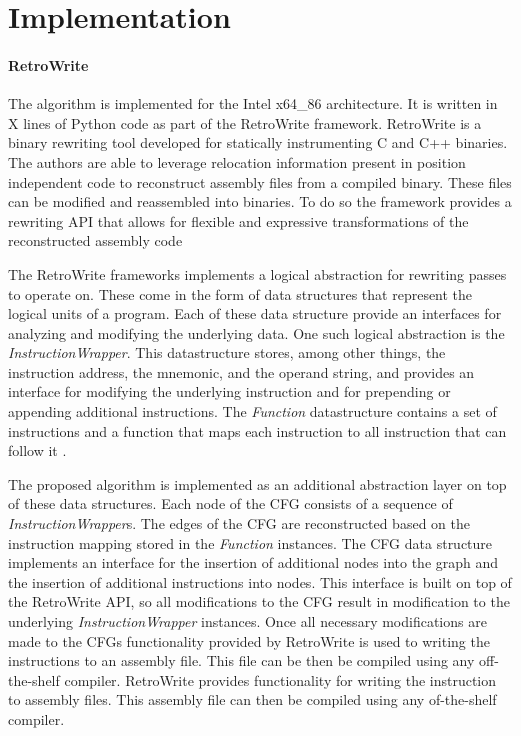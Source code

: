 

\chapter{Implementation}

\subsubsection{RetroWrite}
The algorithm is implemented for the Intel x64\_86 architecture. It is written in X lines of Python code as part of the RetroWrite framework. 
RetroWrite is a binary rewriting tool developed for statically instrumenting C and C++ binaries. 
The authors are able to leverage relocation information present in position independent code to reconstruct assembly files from a compiled binary. 
These files can be modified and reassembled into binaries. 
To do so the framework provides a rewriting API that allows for flexible and expressive transformations of the reconstructed assembly code \cite{Dinesh2020RetroWriteSI}

The RetroWrite frameworks implements a logical abstraction for rewriting passes to operate on.
These come in the form of data structures that represent the logical units of a program.
Each of these data structure provide an interfaces for analyzing and modifying the underlying data. 
One such logical abstraction is the \textit{InstructionWrapper}. 
This datastructure stores, among other things, the instruction address, the mnemonic, and the operand string, and provides an interface
for modifying the underlying instruction and for prepending or appending additional instructions.  
The \textit{Function} datastructure contains a set of instructions and a function that maps each instruction to all instruction that can follow it \cite{Dinesh2020RetroWriteSI,  hexhive}. 

The proposed algorithm is implemented as an additional abstraction layer on top of these data structures. 
Each node of the CFG consists of a sequence of \textit{InstructionWrapper}s. 
The edges of the CFG are reconstructed based on the instruction mapping stored in the \textit{Function} instances. 
The CFG data structure implements  an interface for the insertion of additional nodes into the graph and the insertion of additional instructions into nodes. 
This interface is built on top of the RetroWrite API, so all modifications to the CFG result in modification to the underlying \textit{InstructionWrapper} instances. 
Once all necessary modifications are made to the CFGs functionality provided by RetroWrite is used to writing the instructions to an assembly file. 
This file can be then be compiled using any off-the-shelf compiler.
RetroWrite provides functionality for writing the instruction to assembly files. This assembly file can then be compiled using any of-the-shelf compiler. 



